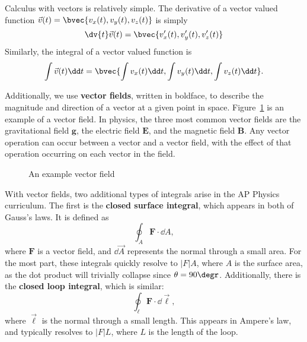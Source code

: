 \documentclass[11pt]{article}
\begin{document}
Calculus with vectors is relatively simple. The derivative of a vector valued function $\vec{v}(t) = \bvec{v_x(t), v_y(t), v_z(t)}$ is simply
\begin{equation}
    \dv{t}\vec{v}(t) = \bvec{v'_x(t), v'_y(t), v'_z(t)}
\end{equation}
Similarly, the integral of a vector valued function is
\begin{equation}
    \int \vec{v}(t) \dd t = \bvec{\int v_x(t)\dd t, \int v_y(t)\dd t, \int v_z(t)\dd t}.
\end{equation}

Additionally, we use \textbf{vector fields}, written in boldface, to describe the magnitude and direction of a vector at a given point in space. Figure~\ref{vectorfieldexample} is an example of a vector field. In physics, the three most common vector fields are the gravitational field $\mathbf{g}$, the electric field $\mathbf{E}$, and the magnetic field $\mathbf{B}$. Any vector operation can occur between a vector and a vector field, with the effect of that operation occurring on each vector in the field.

\begin{figure}[t!]\label{vectorfieldexample}
    \centering
\caption{An example vector field}
\end{figure}

With vector fields, two additional types of integrals arise in the AP Physics curriculum. The first is the \textbf{closed surface integral}, which appears in both of Gauss's laws. It is defined as
\begin{equation}
    \oint_A \mathbf{F} \cdot \dd A,
\end{equation}
where $\mathbf{F}$ is a vector field, and $\dd \vec{A}$ represents the normal through a small area. For the most part, these integrals quickly resolve to $|F|A$, where $A$ is the surface area, as the dot product will trivially collapse since $\theta = 90\degr$. Additionally, there is the \textbf{closed loop integral}, which is similar:
\begin{equation}
    \oint_{\ell} \mathbf{F} \cdot \dd\vec{\ell},
\end{equation}
where $\vec{\ell}$ is the normal through a small length. This appears in Ampere's law, and typically resolves to $|F|L$, where $L$ is the length of the loop.
\end{document}
